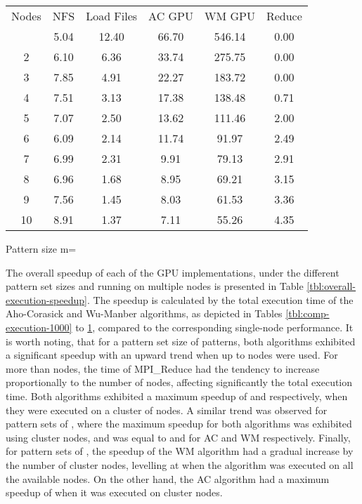 \documentclass{ws-ijait}
\begin{document}
\begin{table}[h]
{\begin{tabular}{@{}c |ccccc@{}} \toprule
Nodes & NFS & Load Files & AC GPU & WM GPU & Reduce\\
\colrule
1 & 5.04 & 12.40 & 66.70 & 546.14 & 0.00\\
2 & 6.10 & 6.36 & 33.74 & 275.75 & 0.00\\
3 & 7.85 & 4.91 & 22.27 & 183.72 & 0.00\\
4 & 7.51 & 3.13 & 17.38 & 138.48 & 0.71\\
5 & 7.07 & 2.50 & 13.62 & 111.46 & 2.00\\
6 & 6.09 & 2.14 & 11.74 & 91.97 & 2.49\\
7 & 6.99 & 2.31 & 9.91 & 79.13 & 2.91\\
8 & 6.96 & 1.68 & 8.95 & 69.21 & 3.15\\
9 & 7.56 & 1.45 & 8.03 & 61.53 & 3.36\\
10 & 8.91 & 1.37 & 7.11 & 55.26 & 4.35\\
\hline
\end{tabular}}
\begin{tabnote}
Pattern size m=
\end{tabnote}
\label{tbl:comp-execution-16000}
\end{table}

The overall speedup of each of the GPU implementations, under the different pattern set sizes and running on multiple nodes is presented in Table \ref{tbl:overall-execution-speedup}. The speedup is calculated by the total execution time of the Aho-Corasick and Wu-Manber algorithms, as depicted in Tables \ref{tbl:comp-execution-1000} to \ref{tbl:comp-execution-16000}, compared to the corresponding single-node performance. It is worth noting, that for a pattern set size of  patterns, both algorithms exhibited a significant speedup with an upward trend when up to  nodes were used. For more than  nodes, the time of MPI\_Reduce had the tendency to increase proportionally to the number of nodes, affecting significantly the total execution time. Both algorithms exhibited a maximum speedup of  and  respectively, when they were executed on a cluster of  nodes. A similar trend was observed for pattern sets of , where the maximum speedup for both algorithms was exhibited using  cluster nodes, and was equal to  and  for AC and WM respectively. Finally, for pattern sets of , the speedup of the WM algorithm had a gradual increase by the number of cluster nodes, levelling at  when the algorithm was executed on all the available nodes. On the other hand, the AC algorithm had a maximum speedup of  when it was executed on  cluster nodes.
\end{document}
